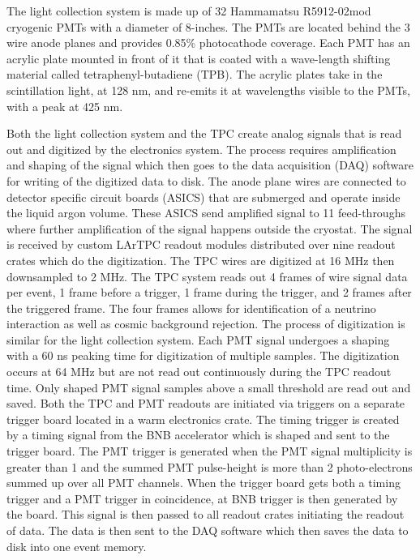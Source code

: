 The light collection system is made up of 32 Hammamatsu R5912-02mod cryogenic PMTs with a diameter of 8-inches. The PMTs are located behind the 3 wire anode planes and provides 0.85\% photocathode coverage. Each PMT has an acrylic plate mounted in front of it that is coated with a wave-length shifting material called tetraphenyl-butadiene (TPB). The acrylic plates take in the scintillation light, at 128 nm, and re-emits it at wavelengths visible to the PMTs, with a peak at 425 nm. 

Both the light collection system and the TPC create analog signals that is read out and digitized by the electronics system. The process requires amplification and shaping of the signal which then goes to the data acquisition (DAQ) software for writing of the digitized data to disk. The anode plane wires are connected to detector specific circuit boards (ASICS) that are submerged and operate inside the liquid argon volume. These ASICS send amplified signal to 11 feed-throughs where further amplification of the signal happens outside the cryostat. The signal is received by custom LArTPC readout modules distributed over nine readout crates which do the digitization. The TPC wires are digitized at 16 MHz then downsampled to 2 MHz. The TPC system reads out 4 frames of wire signal data per event, 1 frame before a trigger, 1 frame during the trigger, and 2 frames after the triggered frame. The four frames allows for identification of a neutrino interaction as well as cosmic background rejection. The process of digitization is similar for the light collection system. Each PMT signal undergoes a shaping with a 60 ns  peaking time for digitization of multiple samples. The digitization occurs at 64 MHz but are not read out continuously during the TPC readout time. Only shaped PMT signal samples above a small threshold are read out and saved. Both the TPC and PMT readouts are initiated via triggers on a separate trigger board located in a warm electronics crate. The timing trigger is created by a timing signal from the BNB accelerator which is shaped and sent to the trigger board. The PMT trigger is generated when the PMT signal multiplicity is greater than 1 and the summed PMT pulse-height is more than 2 photo-electrons summed up over all PMT channels. When the trigger board gets both a timing trigger and a PMT trigger in coincidence, at BNB trigger is then generated by the board. This signal is then passed to all readout crates initiating the readout of data. The data is then sent to the DAQ software which then saves the data to disk into one event memory.

